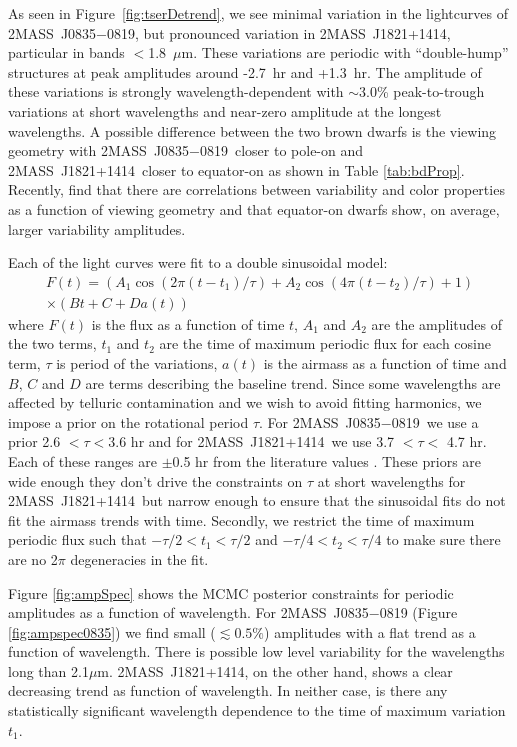\documentclass[twocolumn]{aastex6}
\newcommand{\sha}{2MASS~J0835$-$0819}
\newcommand{\shb}{2MASS~J1821+1414}
\begin{document}
As seen in Figure~\ref{fig:tserDetrend}, we see minimal variation in the lightcurves of {\sha}, but pronounced variation in {\shb}, particular in bands $<$1.8~$\mu$m. 
These variations are periodic with ``double-hump'' structures at peak amplitudes around -2.7~hr and +1.3~hr.
The amplitude of these variations is strongly wavelength-dependent with $\sim$3.0\% peak-to-trough variations at short 
wavelengths and near-zero amplitude at the longest wavelengths.
A possible difference between the two brown dwarfs is the viewing geometry with \sha\ closer to pole-on and \shb\ closer to equator-on as shown in Table \ref{tab:bdProp}.
Recently, \citet{vos2017viewingGeom} find that there are correlations between variability and color properties as a function of viewing geometry and that equator-on dwarfs show, on average, larger variability amplitudes.

Each of the light curves were fit to a double sinusoidal model:
\begin{equation}\label{eq:cosfit}
\begin{split}
F(t) = \left( A_1 \cos(2 \pi (t - t_1)/\tau) + A_2 \cos(4 \pi (t - t_2)/\tau) + 1\right) \\
\times (B t + C + D a(t))
\end{split}
\end{equation}
where $F(t)$ is the flux as a function of time $t$, $A_1$ and $A_2$ are the amplitudes of the two terms, $t_1$ and $t_2$ are the time of maximum periodic flux for each cosine term, $\tau$ is period of the variations, $a(t)$ is the airmass as a function of time and $B$, $C$ and $D$ are terms describing the baseline trend.
Since some wavelengths are affected by telluric contamination and we wish to avoid fitting harmonics, we impose a prior on the rotational period $\tau$.
For \sha\ we use a prior 2.6 $< \tau < $3.6 hr and for \shb\ we use 3.7 $< \tau <$ 4.7 hr.
Each of these ranges are $\pm$0.5 hr from the literature values \citep[3.1,4.2hr][]{2004MNRAS.354..378K,2015ApJ...799..154M}.
These priors are wide enough they don't drive the constraints on $\tau$ at short wavelengths for \shb\ but narrow enough to ensure that the sinusoidal fits do not fit the airmass trends with time.
Secondly, we restrict the time of maximum periodic flux such that $-\tau/2 < t_1 < \tau/2$ and $-\tau/4 < t_2 < \tau/4$ to make sure there are no 2$\pi$ degeneracies in the fit.


Figure \ref{fig:ampSpec} shows the MCMC posterior constraints for periodic amplitudes as a function of wavelength.
For {\sha} (Figure \ref{fig:ampspec0835}) we find small ($\lesssim 0.5\%$) amplitudes with a flat trend as a function of wavelength.
There is possible low level variability for the wavelengths long than 2.1$\mu$m.
\shb, on the other hand, shows a clear decreasing trend as function of wavelength.
In neither case, is there any statistically significant wavelength dependence to the time of maximum variation $t_1$.
\end{document}
